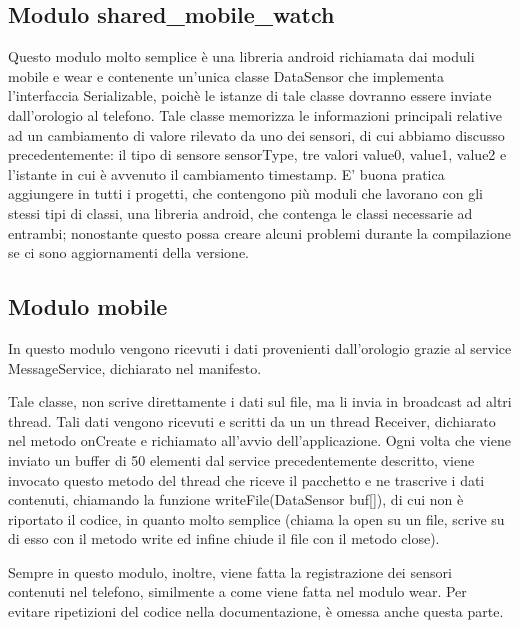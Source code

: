 \documentclass[a4paper, oneside]{book}
\begin{document}
\subsection{Modulo shared\_mobile\_watch}
Questo modulo molto semplice è una libreria android richiamata dai moduli mobile e wear e contenente un’unica classe DataSensor che implementa l’interfaccia Serializable, poichè le istanze di tale classe dovranno essere inviate dall’orologio al telefono. 
Tale classe memorizza le informazioni principali relative ad un cambiamento di valore rilevato da uno dei sensori, di cui abbiamo discusso precedentemente:  il tipo di sensore sensorType, tre valori value0, value1, value2 e l’istante in cui è avvenuto il cambiamento timestamp.
E’ buona pratica aggiungere in tutti i progetti, che contengono più moduli che lavorano con gli stessi tipi di classi, una libreria android, che contenga le classi necessarie ad entrambi; nonostante questo possa creare alcuni problemi durante la compilazione se ci sono aggiornamenti della versione.
\makebox[\linewidth]{}



\subsection{Modulo mobile}
In questo modulo vengono ricevuti i dati provenienti dall’orologio grazie al service MessageService, dichiarato nel manifesto.\\
\makebox[\linewidth]{}

\makebox[\linewidth]{}
Tale classe, non scrive direttamente i dati sul file, ma li invia in broadcast ad altri thread. Tali dati vengono ricevuti e scritti da un un thread Receiver, dichiarato nel metodo onCreate e richiamato all’avvio dell’applicazione. Ogni volta che viene inviato un buffer di 50 elementi dal service precedentemente descritto, viene invocato questo metodo del thread che riceve il pacchetto e ne trascrive i dati contenuti, chiamando la funzione writeFile(DataSensor buf[]), di cui non è riportato il codice, in quanto molto semplice (chiama la open su un file, scrive su di esso con il metodo write ed infine chiude il file con il metodo close). 

\vspace{2mm}

\vspace{2mm}
Sempre in questo modulo, inoltre, viene fatta la registrazione dei sensori contenuti nel telefono, similmente a come viene fatta nel modulo wear. Per evitare ripetizioni del codice nella documentazione, è omessa anche questa parte.
\end{document}
